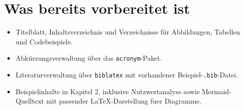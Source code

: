 \section{Was bereits vorbereitet ist}
\begin{itemize}
    \item Titelblatt, Inhaltsverzeichnis und Verzeichnisse für Abbildungen, Tabellen und Codebeispiele.
    \item Abkürzungsverwaltung über das \texttt{acronym}-Paket.
    \item Literaturverwaltung über \texttt{biblatex} mit vorhandener Beispiel-\texttt{.bib}-Datei.
    \item Beispielinhalte in Kapitel 2, inklusive Nutzwertanalyse sowie Mermaid-Quelltext mit passender LaTeX-Darstellung fuer Diagramme.
\end{itemize}
